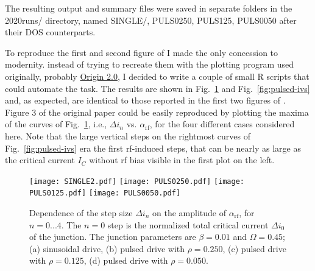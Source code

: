 The resulting output and summary files were saved in separate folders in the \textsf{2020runs/} directory, named \textsf{SINGLE/}, \textsf{PULS0250}, \textsf{PULS125}, \textsf{PULS0050} after their DOS counterparts.

To reproduce the first and second figure of \cite{Maggi:1996} I made the only concession to modernity. instead of trying to recreate them with the plotting program used originally, probably \href{https://www.originlab.com}{Origin 2.0}, I decided to write a couple of small R scripts that could automate the task.
The results are shown in Fig.~\ref{fig:step-width} and Fig.~\ref{fig:pulsed-ivs} and, as expected, are identical to those reported in the first two figures of \cite{Maggi:1996}. 
Figure 3 of the original paper could be easily reproduced by plotting the maxima of the curves of Fig.~\ref{fig:step-width}, i.e., $\Delta i_n$ vs. $\alpha_\mathrm{rf}$, for the four different cases considered here.
Note that the large vertical steps on the rightmost curves of Fig.~\ref{fig:pulsed-ivs} era the first rf-induced steps, that can be nearly as large as the critical current $I_C$ without rf bias visible in the first plot on the left.

\begin{figure}[p]
	\centering
	\texttt{[image: SINGLE2.pdf]}
	\texttt{[image: PULS0250.pdf]}
	\texttt{[image: PULS0125.pdf]}
	\texttt{[image: PULS0050.pdf]}
	\caption{Dependence of the step size $\Delta i_n$ on the amplitude of  $\alpha_\mathrm{rf}$, for $n = 0. . . 4$. The $n = 0$ step is the normalized total critical current $\Delta i_0$ of the junction. The junction parameters are $\beta = 0. 01$ and $\Omega = 0. 45$; (a) sinusoidal drive, (b) pulsed drive with $\rho = 0. 250$, (c) pulsed drive with $\rho = 0. 125$, (d) pulsed drive with $\rho = 0. 050$.}
	\label{fig:step-width}
\end{figure}

